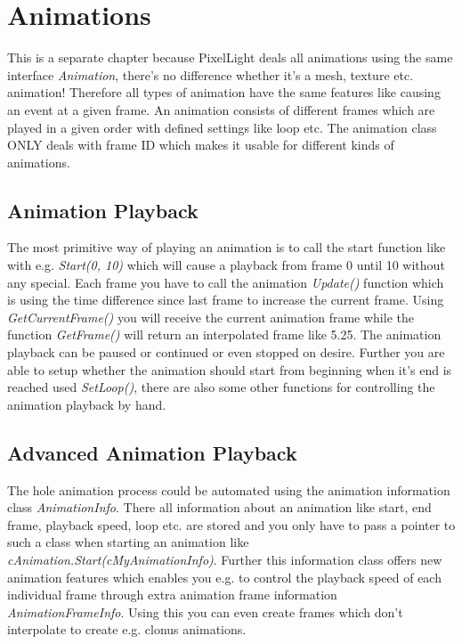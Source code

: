 \section{Animations}
This is a separate chapter because PixelLight deals all animations using the same interface \emph{Animation}, there's no difference whether it's a mesh, texture etc. animation! Therefore all types of animation have the same features like causing an event at a given frame. An animation consists of different frames which are played in a given order with defined settings like loop etc. The animation class ONLY deals with frame ID which makes it usable for different kinds of animations.




\subsection{Animation Playback}
The most primitive way of playing an animation is to call the start function like with e.g. \emph{Start(0, 10)} which will cause a playback from frame 0 until 10 without any special. Each frame you have to call the animation \emph{Update()} function which is using the time difference since last frame to increase the current frame. Using \emph{GetCurrentFrame()} you will receive the current animation frame while the function \emph{GetFrame()} will return an interpolated frame like 5.25. The animation playback can be paused or continued or even stopped on desire. Further you are able to setup whether the animation should start from beginning when it's end is reached used \emph{SetLoop()}, there are also some other functions for controlling the animation playback by hand.




\subsection{Advanced Animation Playback}
The hole animation process could be automated using the animation information class \emph{AnimationInfo}. There all information about an animation like start, end frame, playback speed, loop etc. are stored and you only have to pass a pointer to such a class when starting an animation like \emph{cAnimation.Start(cMyAnimationInfo)}. Further this information class offers new animation features which enables you e.g. to control the playback speed of each individual frame through extra animation frame information \emph{AnimationFrameInfo}. Using this you can even create frames which don't interpolate to create e.g. clonus animations.
